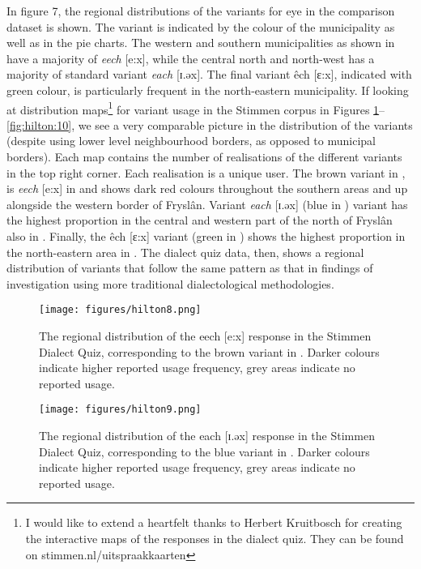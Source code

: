 \documentclass[output=paper,hidelinks]{langscibook}
\begin{document}
In figure 7, the regional distributions of the variants for eye in the comparison dataset is shown. The variant is indicated by the colour of the municipality as well as in the pie charts. The western and southern municipalities as shown in  have a majority of \textit{eech} [e:x], while the central north and north-west has a majority of standard variant \textit{each} [ɪ.əx]. The final variant êch [ɛ:x], indicated with green colour, is particularly frequent in the north-eastern municipality. If looking at distribution maps\footnote{I would like to extend a heartfelt thanks to Herbert Kruitbosch for creating the interactive maps of the responses in the dialect quiz. They can be found on stimmen.nl/uitspraakkaarten} for variant usage in the Stimmen corpus in Figures \ref{fig:hilton:8}--\ref{fig:hilton:10}, we see a very comparable picture in the distribution of the variants (despite using lower level neighbourhood borders, as opposed to municipal borders). Each map contains the number of realisations of the different variants in the top right corner. Each realisation is a unique user. The brown variant in , is \textit{eech} [e:x] in  and shows dark red colours throughout the southern areas and up alongside the western border of Fryslân. Variant \textit{each} [ɪ.əx] (blue in ) variant has the highest proportion in the central and western part of the north of Fryslân also in . Finally, the êch [ɛ:x] variant (green in ) shows the highest proportion in the north-eastern area in . The dialect quiz data, then, shows a regional distribution of variants that follow the same pattern as that in findings of investigation using more traditional dialectological methodologies.

\begin{figure}
  \texttt{[image: figures/hilton8.png]}
  \caption{ The regional distribution of the eech [e:x] response in the Stimmen Dialect Quiz, corresponding to the brown variant in . Darker colours indicate higher reported usage frequency, grey areas indicate no reported usage.}
 \label{fig:hilton:8}
\end{figure}


 \begin{figure}
  \texttt{[image: figures/hilton9.png]}
  \caption{The regional distribution of the each [ɪ.əx] response in the Stimmen Dialect Quiz, corresponding to the blue variant in . Darker colours indicate higher reported usage frequency, grey areas indicate no reported usage.}
 \label{fig:hilton:9}
\end{figure}
\end{document}
